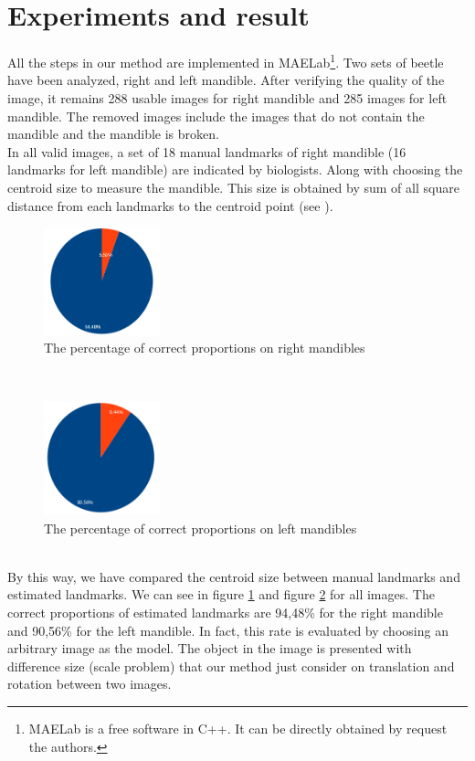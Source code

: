 \documentclass[twoside,twocolumn,10pt]{article}
\begin{document}
\section{Experiments and result}
All the steps in our method are implemented in MAELab\footnote{MAELab
  is a free software in C++. It can be directly obtained by request
  the authors.}. Two sets of beetle have been analyzed, right and left
mandible. After verifying the quality of the image, it remains 288
usable images for right mandible and 285 images for left mandible. The
removed images include the images that do not contain the mandible and
the mandible is broken.\\

In all valid images, a set of 18 manual landmarks of right mandible
(16 landmarks for left mandible) are indicated by biologists. Along
with choosing the centroid size to measure the mandible. This size is
obtained by sum of all square distance from each landmarks to the
centroid point (see \cite{Webster}).

\begin{figure}[htb]
    \centering
    \includegraphics[width=0.3\textwidth]{./images/mdresult}
    \caption{The percentage of correct proportions on right mandibles }
    \label{figmdresult}
\end{figure}~\\
\begin{figure}[htb]
    \centering
    \includegraphics[width=0.3\textwidth]{./images/mgresult}
    \caption{The percentage of correct proportions on left mandibles }
    \label{figmgresult}
\end{figure}~\\
By this way, we have compared the centroid size between manual
landmarks and estimated landmarks. We can see in figure
\ref{figmdresult} and figure \ref{figmgresult} for all images. The
correct proportions of estimated landmarks are 94,48\% for the right
mandible and 90,56\% for the left mandible. In fact, this rate is
evaluated by choosing an arbitrary image as the model. The object in
the image is presented with difference size (scale problem) that our
method just consider on translation and rotation between two
images. \\
\end{document}
